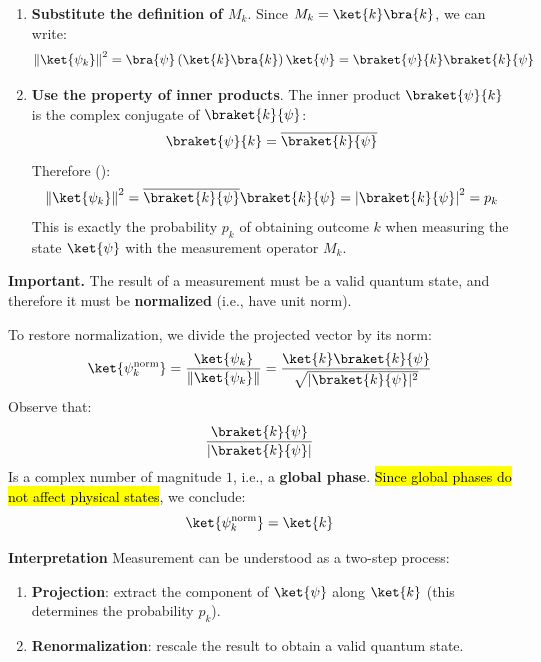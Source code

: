 \begin{deepeningbox}[: Why $\|\ket{\psi_k}\|^2 = p_k$?]
\begin{enumerate}
    \item \textbf{Substitute the definition of $M_k$}. Since $M_k = \ket{k}\bra{k}$, we can write:
    \begin{equation*}
      \left\| \ket{\psi_{k}} \right\|^{2} = \bra{\psi} \left(\ket{k}\bra{k}\right) \ket{\psi} = \braket{\psi}{k} \braket{k}{\psi}
    \end{equation*}
    \item \textbf{Use the property of inner products}. The inner product $\braket{\psi}{k}$ is the complex conjugate of $\braket{k}{\psi}$:
    \begin{equation*}
      \braket{\psi}{k} = \overline{\braket{k}{\psi}}
    \end{equation*}
    Therefore ():
    \begin{equation*}
      \left\| \ket{\psi_{k}} \right\|^{2} = \overline{\braket{k}{\psi}} \braket{k}{\psi} = \left|\braket{k}{\psi}\right|^{2} = p_k
    \end{equation*}
    This is exactly the probability $p_k$ of obtaining outcome $k$ when measuring the state $\ket{\psi}$ with the measurement operator $M_k$.
  \end{enumerate}
\end{deepeningbox}

\highspace
\textcolor{Red2}{ \textbf{Important.}} The result of a measurement must be a valid quantum state, and therefore it must be \textbf{normalized} (i.e., have unit norm).

\highspace
To restore normalization, we divide the projected vector by its norm:
\begin{equation*}
  \ket{\psi_k^{\text{norm}}}
  =
  \frac{\ket{\psi_k}}{\|\ket{\psi_k}\|}
  =
  \frac{\ket{k}\braket{k}{\psi}}{\sqrt{|\braket{k}{\psi}|^2}}
\end{equation*}
Observe that:
\begin{equation*}
  \frac{\braket{k}{\psi}}{|\braket{k}{\psi}|}
\end{equation*}
Is a complex number of magnitude $1$, i.e., a \textbf{global phase}. \hl{Since global phases do not affect physical states}, we conclude:
\begin{equation*}
  \ket{\psi_k^{\text{norm}}} = \ket{k}
\end{equation*}

\highspace
\textcolor{Green3}{ \textbf{Interpretation}} Measurement can be understood as a two-step process:
\begin{enumerate}
  \item \textbf{Projection}: extract the component of $\ket{\psi}$ along $\ket{k}$ (this determines the probability $p_k$).
  \item \textbf{Renormalization}: rescale the result to obtain a valid quantum state.
\end{enumerate}

